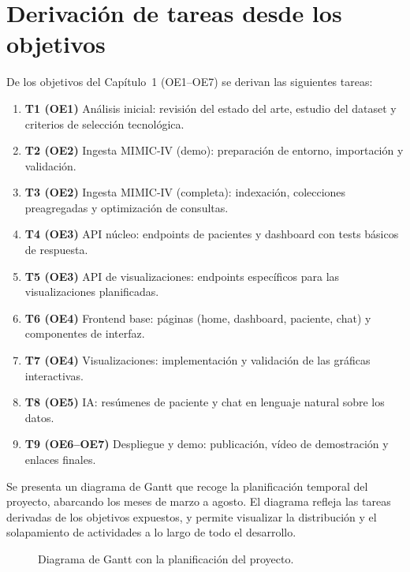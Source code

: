 \section{Derivación de tareas desde los objetivos}

De los objetivos del Capítulo~1 (OE1–OE7) se derivan las siguientes tareas:

\begin{enumerate}
  \item \textbf{T1 (OE1)} Análisis inicial: revisión del estado del arte, estudio del dataset y criterios de selección tecnológica.
  \item \textbf{T2 (OE2)} Ingesta MIMIC-IV (demo): preparación de entorno, importación y validación.
  \item \textbf{T3 (OE2)} Ingesta MIMIC-IV (completa): indexación, colecciones preagregadas y optimización de consultas.
  \item \textbf{T4 (OE3)} API núcleo: endpoints de pacientes y dashboard con tests básicos de respuesta.
  \item \textbf{T5 (OE3)} API de visualizaciones: endpoints específicos para las visualizaciones planificadas.
  \item \textbf{T6 (OE4)} Frontend base: páginas (home, dashboard, paciente, chat) y componentes de interfaz.
  \item \textbf{T7 (OE4)} Visualizaciones: implementación y validación de las gráficas interactivas.
  \item \textbf{T8 (OE5)} IA: resúmenes de paciente y chat en lenguaje natural sobre los datos.
  \item \textbf{T9 (OE6–OE7)} Despliegue y demo: publicación, vídeo de demostración y enlaces finales.
\end{enumerate}

Se presenta un diagrama de Gantt que recoge la planificación temporal del proyecto, abarcando los meses de marzo a agosto. El diagrama refleja las tareas derivadas de los objetivos expuestos, y permite visualizar la distribución y el solapamiento de actividades a lo largo de todo el desarrollo.

\begin{figure}[H]
    \centering
    \caption{Diagrama de Gantt con la planificación del proyecto.}
\end{figure}


